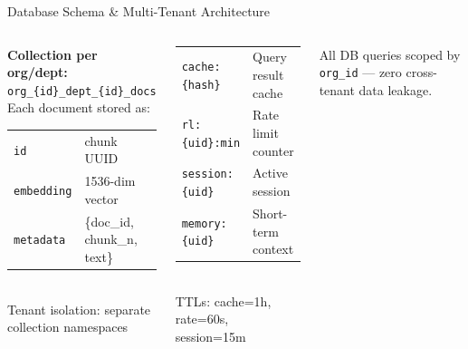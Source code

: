 \documentclass[aspectratio=169,12pt]{beamer}
\begin{document}
\begin{frame}{Database Schema \& Multi-Tenant Architecture}
\begin{columns}[T]
  \begin{tcolorbox}[mybox,title={ChromaDB Collections}]
    \tiny
    \textbf{Collection per org/dept:}\\
    \texttt{org\_\{id\}\_dept\_\{id\}\_docs}\\[4pt]
    Each document stored as:\\
    \begin{tabular}{@{}ll@{}}
    \texttt{id} & chunk UUID\\
    \texttt{embedding} & 1536-dim vector\\
    \texttt{metadata} & \{doc\_id, chunk\_n, text\}\\
    \end{tabular}\\[4pt]
    Tenant isolation: separate collection namespaces
  \end{tcolorbox}
  \vspace{4pt}
  \begin{tcolorbox}[mybox,title={Redis Keys}]
    \tiny
    \begin{tabular}{@{}ll@{}}
    \texttt{cache:\{hash\}} & Query result cache\\
    \texttt{rl:\{uid\}:min} & Rate limit counter\\
    \texttt{session:\{uid\}} & Active session\\
    \texttt{memory:\{uid\}} & Short-term context\\
    \end{tabular}\\[4pt]
    TTLs: cache=1h, rate=60s, session=15m
  \end{tcolorbox}
  \vspace{4pt}
  \begin{tcolorbox}[pillbox]\tiny All DB queries scoped by \texttt{org\_id} — zero cross-tenant data leakage.\end{tcolorbox}
\end{columns}
\end{frame}
\end{document}
